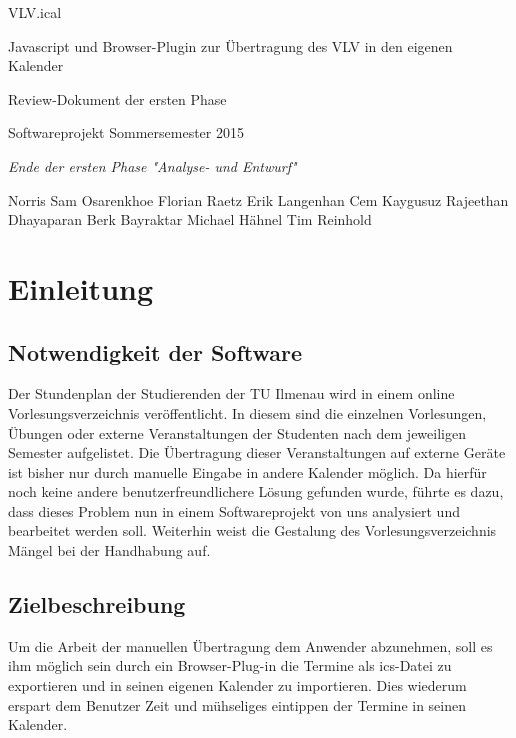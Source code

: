 \documentclass[11pt]{scrreprt}
\begin{document}
\begin{center}
\Huge
VLV.ical

\medskip
\large
Javascript und Browser-Plugin zur \"Ubertragung des VLV in den eigenen Kalender

\vskip 1in
\Large
Review-Dokument der ersten Phase

\large
\vskip 2in
Softwareprojekt Sommersemester 2015

\medskip
\textit{
Ende der ersten Phase "Analyse- und Entwurf"
}
\vskip 3in

\normalsize
\textup{ 
Norris Sam Osarenkhoe \qquad
Florian Raetz \qquad
}
\textup{ 
Erik Langenhan \qquad
Cem Kaygusuz \qquad
}
\textup{ 
Rajeethan Dhayaparan \qquad
Berk Bayraktar \qquad
}
\textup{ 
Michael H\"ahnel \qquad
Tim Reinhold
}
\end{center}

\newpage
\tableofcontents

\newpage
\chapter{Einleitung}

\section{Notwendigkeit der Software}
\normalsize \normalfont \textnormal
Der Stundenplan der Studierenden der TU Ilmenau wird in einem online Vorlesungsverzeichnis veröffentlicht. In diesem sind die einzelnen Vorlesungen, Übungen oder externe Veranstaltungen der Studenten nach dem jeweiligen Semester aufgelistet. Die Übertragung dieser Veranstaltungen auf externe Geräte ist bisher nur durch manuelle Eingabe in andere Kalender möglich. Da hierfür noch keine andere benutzerfreundlichere Lösung gefunden wurde, führte es dazu, dass dieses Problem nun in einem Softwareprojekt von uns analysiert und bearbeitet werden soll. Weiterhin weist die Gestalung des Vorlesungsverzeichnis Mängel bei der Handhabung auf.

\section{Zielbeschreibung}
Um die Arbeit der manuellen Übertragung dem Anwender abzunehmen, soll es ihm möglich sein durch ein Browser-Plug-in die Termine als ics-Datei zu exportieren und in seinen eigenen Kalender zu importieren. Dies wiederum erspart dem Benutzer Zeit und mühseliges eintippen der Termine in seinen Kalender.
\end{document}
